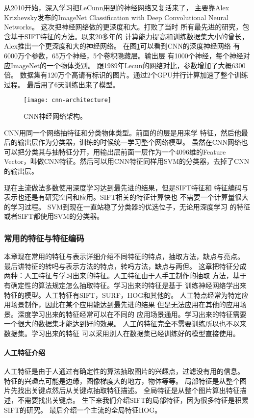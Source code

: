 从2010开始，深入学习把LeCunn用到的神经网络又复活来了，
主要靠Alex Krizhevsky发布的ImageNet Classification with Deep Convolutional Neural Networks。
这次把神经网络做的更深度和大。打败了当时
所有最先进的研究，包含基于SIFT特征的方法。以来20多年的
计算能力提高和训练数据集大小的曾长，Alex推出一个更深度和大的神经网络。
在图\ref{fig:cnn-architecture}可以看到CNN的深度神经网络
有6000万个参数，65万个神经，5个卷积隐藏层。输出层
有1000个神经，每个神经对应ImageNet的一个物体类别。
跟1989年Lecun的网络对比，参数增加了大概6300倍。
数据集有120万个高请有标识的图片。通过2个GPU并行计算加速了整个训练过程。
最后用了6天训练出来了模型。\cite{krizhevsky2012imagenet,lee2009convolutional}
\begin{figure}[H]
  \centering
    \texttt{[image: cnn-architecture]}
  \caption{CNN神经网络架构。\cite{krizhevsky2012imagenet}}
  \label{fig:cnn-architecture}
\end{figure}

CNN用同一个网络抽特征和分类物体类型。前面的的层是用来学
特征，然后他最后的输出层作为分类器，训练的时候统一学习整个网络模型。
虽然在CNN网络也可以把分类其与抽特征分开，用输出层前面一层作为一个4096维的Feature 
Vector，叫做CNN特征。然后可以用CNN特征同样用SVM的分类器，去掉了CNN的输出层。
\cite{Razavian_2014_CVPR_Workshops}

现在主流做法多数使用深度学习达到最先进的结果，但是SIFT特征和
特征编码与表示也还是有研究空间和应用。SIFT相关的特征计算快也
不需要一个计算量很大的学习过程。
SVM到现在一直站稳了分类器的优选位子，无论用深度学习
的特征或者SIFT都使用SVM的分类器。

\subsubsection{常用的特征与特征编码}
\label{intro:image_features}
本章现在常用的特征与表示详细介绍不同特征的特点，抽取方法，缺点与亮点。
最后讲特征的转吗与表示方法的特点，转吗方法，缺点与两但。
这章把特征分成两种：人工特征与学习出来的特征。人工特征由于人手工制作的抽取
方法，基于有确定性的算法规定怎么抽取特征。学习出来的特征是基于
训练神经网络学出来特征的模型。人工特征有SIFT，SURF，HOG和其他的。
人工特点经常为特定应用场景制作，因此在某个应用能达到最先进的结果
但是无法应用在其他的应用场景。深度学习出来的特征经常可以在不同的
应用场景通用。学习出来的特征需要一个很大的数据集才能达到好的效果。
人工的特征完全不需要训练所以也不以来数据集。学习出来的特征
可以采用别人在数据集已经训练好的模型直接使用。

\paragraph{人工特征介绍}
人工特征是由于人通过有确定性的算法抽取图片的兴趣点，过滤没有用的信息。
特征的兴趣点可能是边缘，图像梯度大的地方，物体等等。
局部特征是从整个图片先找出关键点然后从关键点抽取特征描述。
全局特征是从整个图片算出特征描述，不需要找出关键点。
生下来我们介绍SIFT的局部特征，因为很多特征是积累SIFT的研究。
最后介绍一个主流的全局特征HOG。

